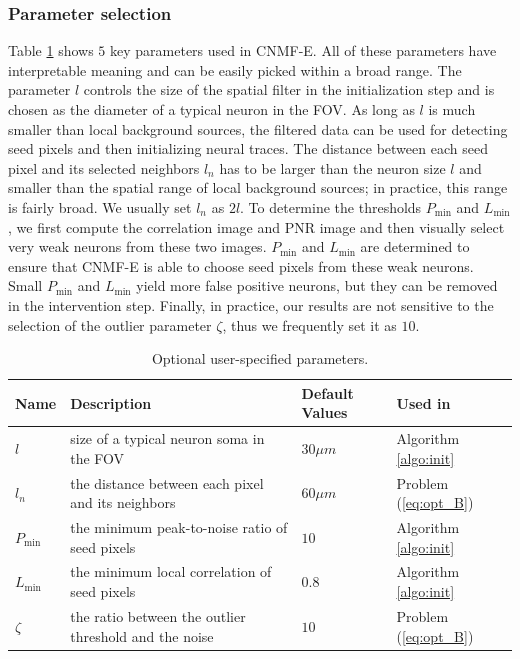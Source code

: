 \documentclass[9pt,lineno]{elife}
\begin{document}

\subsubsection{Parameter selection}
Table \ref{table:pars} shows $5$ key parameters used in  CNMF-E. All of these parameters have interpretable meaning and can be easily picked within a broad range. The parameter $l$ controls the size of the spatial filter in the initialization step and is chosen as the diameter of a typical neuron in the FOV. As long as $l$ is much smaller than local background sources, the filtered data can be used for detecting seed pixels and then initializing neural traces. The distance between each seed pixel and its selected neighbors $l_n$ has to be larger than the neuron size $l$ and smaller than the spatial range of local background sources; in practice, this range is fairly broad. We usually set $l_n$ as $2l$.  To determine the thresholds $P_{\min}$ and $L_{\min}$, we first compute the correlation image and PNR image and then visually select very weak neurons from these two images. $P_{\min}$ and $L_{\min}$ are determined to ensure that CNMF-E is able to choose seed pixels from these weak neurons. Small $P_{\min}$ and $L_{\min}$ yield more false positive neurons, but they can be removed in the  intervention step. 
Finally, in practice, our results are not sensitive to the selection of the outlier parameter $\zeta$, thus we frequently set it as $10$.

\begin{table}[t!]
  \begin{tabular}{llll}
    \toprule
    \cmidrule{1-2}
    Name     & Description    %
    & Default Values &  Used in\\
    \midrule
    $l$ & size of a typical neuron soma in the FOV
    & $30\mu m$ & Algorithm \ref{algo:init}\\
    $l_n$ & the distance between each pixel and its neighbors & $60\mu m$ &Problem (\ref{eq:opt_B})\\
    $P_{\min}$ & the minimum peak-to-noise ratio of seed pixels & $10$& Algorithm \ref{algo:init}\\
    $L_{\min}$ & the minimum local correlation of seed pixels & $0.8$& Algorithm \ref{algo:init}\\     
    $\zeta$ & the ratio between the outlier threshold and the noise & $10$ & Problem (\ref{eq:opt_B})\\
    \bottomrule
  \end{tabular} 
    \caption{Optional user-specified parameters.}
  \label{table:pars}
\end{table}
\end{document}
